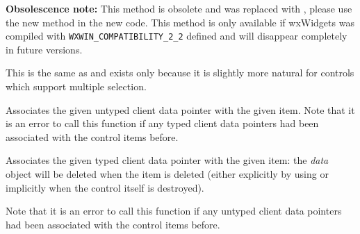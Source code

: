
{\bf Obsolescence note:} This method is obsolete and was replaced with
, please use the new method in
the new code. This method is only available if wxWidgets was compiled with
{\tt WXWIN\_COMPATIBILITY\_2\_2} defined and will disappear completely in
future versions.


\label{wxcontrolwithitemsselect}


This is the same as  and
exists only because it is slightly more natural for controls which support
multiple selection.


\label{wxcontrolwithitemssetclientdata}


Associates the given untyped client data pointer with the given item. Note that
it is an error to call this function if any typed client data pointers had been
associated with the control items before.





\label{wxcontrolwithitemssetclientobject}


Associates the given typed client data pointer with the given item: the
{\it data} object will be deleted when the item is deleted (either explicitly
by using  or implicitly when the
control itself is destroyed).

Note that it is an error to call this function if any untyped client data
pointers had been associated with the control items before.





\label{wxcontrolwithitemssetselection}

